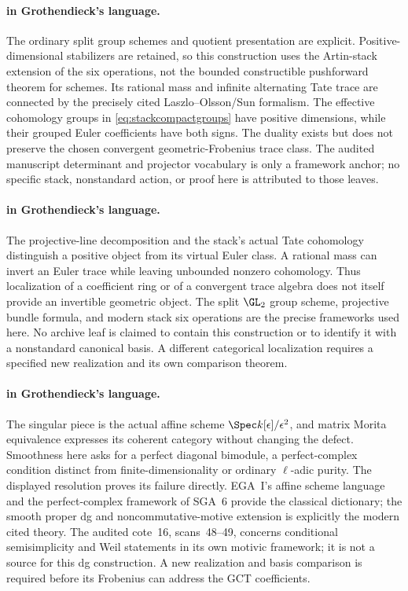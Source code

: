 \paragraph{ in Grothendieck's language.}
The ordinary split group schemes and quotient presentation are
explicit. Positive-dimensional stabilizers are retained, so this
construction uses the Artin-stack extension of the six operations,
not the bounded constructible pushforward theorem for schemes.
Its rational mass and infinite alternating Tate trace are connected
by the precisely cited Laszlo--Olsson/Sun formalism. The effective
cohomology groups in \eqref{eq:stackcompactgroups} have positive
dimensions, while their grouped Euler coefficients have both signs.
The duality exists but does not preserve the chosen convergent
geometric-Frobenius trace class. The audited manuscript determinant
and projector vocabulary is only a framework anchor; no specific
stack, nonstandard action, or proof here is attributed to those leaves.

\paragraph{ in Grothendieck's language.}
The projective-line decomposition and the stack's actual Tate
cohomology distinguish a positive object from its virtual Euler
class. A rational mass can invert an Euler trace while leaving
unbounded nonzero cohomology. Thus localization of a coefficient
ring or of a convergent trace algebra does not itself provide an
invertible geometric object. The split $\GL_2$ group scheme,
projective bundle formula, and modern stack six operations are
the precise frameworks used here. No archive leaf is claimed to
contain this construction or to identify it with a nonstandard
canonical basis. A different categorical localization requires a
specified new realization and its own comparison theorem.

\paragraph{ in Grothendieck's language.}
The singular piece is the actual affine scheme
$\Spec k[\epsilon]/\epsilon^2$, and matrix Morita equivalence
expresses its coherent category without changing the defect.
Smoothness here asks for a perfect diagonal bimodule, a perfect-complex
condition distinct from finite-dimensionality or ordinary $\ell$-adic
purity. The displayed resolution proves its failure directly. EGA~I's
affine scheme language and the perfect-complex framework of SGA~6
provide the classical dictionary; the smooth proper dg and
noncommutative-motive extension is explicitly the modern cited theory.
The audited cote~16, scans~48--49, concerns conditional semisimplicity
and Weil statements in its own motivic framework; it is not a source
for this dg construction. A new realization and basis comparison is
required before its Frobenius can address the GCT coefficients.


